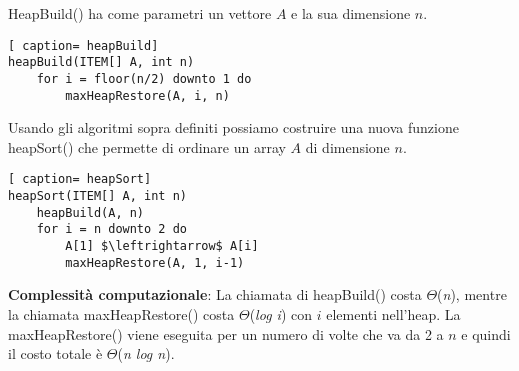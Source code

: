 \documentclass[../cheatSheetAlgoritmi.tex]{subfiles}
\begin{document}
HeapBuild() ha come parametri un vettore $A$ e la sua dimensione $n$. 
\begin{lstlisting}[ caption= heapBuild]
heapBuild(ITEM[] A, int n)
	for i = floor(n/2) downto 1 do
		maxHeapRestore(A, i, n)
\end{lstlisting}
Usando gli algoritmi sopra definiti possiamo costruire una nuova funzione heapSort() che permette di ordinare un array $A$ di dimensione $n$. 
\begin{lstlisting}[ caption= heapSort]
heapSort(ITEM[] A, int n)
	heapBuild(A, n)
	for i = n downto 2 do
		A[1] $\leftrightarrow$ A[i]
		maxHeapRestore(A, 1, i-1)
\end{lstlisting}
\textbf{Complessità computazionale}: La chiamata di heapBuild() costa $\Theta$(\textit{n}), mentre la chiamata maxHeapRestore() costa $\Theta$(\textit{log i}) con $i$ elementi nell'heap. La maxHeapRestore() viene eseguita per un numero di volte che va da 2 a $n$ e quindi il costo totale è $\Theta$(\textit{n log n}).
\end{document}
